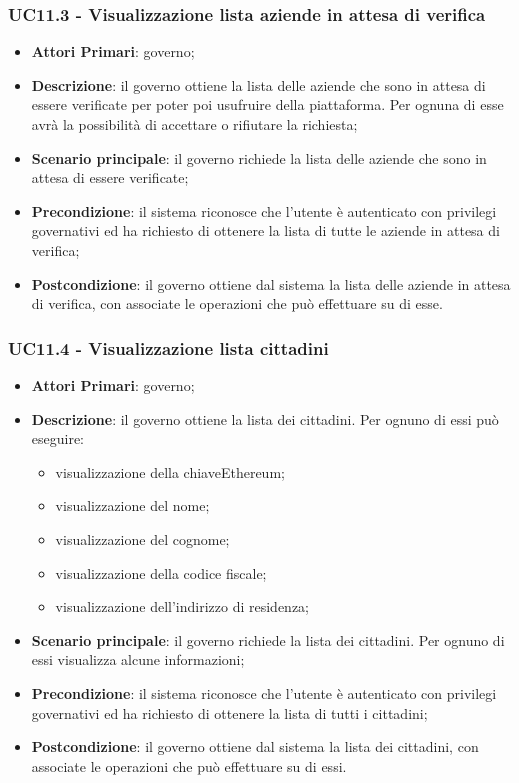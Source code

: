 \subsubsection{UC11.3 - Visualizzazione lista aziende in attesa di verifica}

\begin{itemize}
	\item \textbf{Attori Primari}: governo;
	\item \textbf{Descrizione}: il governo ottiene la lista delle aziende che sono in attesa di essere verificate per poter poi usufruire della piattaforma. Per ognuna di esse avrà la possibilità di accettare o rifiutare la richiesta;
	\item \textbf{Scenario principale}: il governo richiede la lista delle aziende che sono in attesa di essere verificate;
	\item \textbf{Precondizione}: il sistema riconosce che l'utente è autenticato con privilegi governativi ed ha richiesto di ottenere la lista di tutte le aziende in attesa di verifica;
	\item \textbf{Postcondizione}: il governo ottiene dal sistema la lista delle aziende in attesa di verifica, con associate le operazioni che può effettuare su di esse.
\end{itemize}
\subsubsection{UC11.4 - Visualizzazione lista cittadini}
\begin{itemize}
	\item \textbf{Attori Primari}: governo;
	\item \textbf{Descrizione}: il governo ottiene la lista dei cittadini. Per ognuno di essi può eseguire:
	\begin{itemize}
		\item visualizzazione della chiave\glosp Ethereum;
		\item visualizzazione del nome;
		\item visualizzazione del cognome;
		\item visualizzazione della codice fiscale;
		\item visualizzazione dell'indirizzo di residenza;
	\end{itemize}
	\item \textbf{Scenario principale}: il governo richiede la lista dei cittadini. Per ognuno di essi visualizza alcune informazioni;
	\item \textbf{Precondizione}: il sistema riconosce che l'utente è autenticato con privilegi governativi ed ha richiesto di ottenere la lista di tutti i cittadini;
	\item \textbf{Postcondizione}: il governo ottiene dal sistema la lista dei cittadini, con associate le operazioni che può effettuare su di essi.
\end{itemize}
